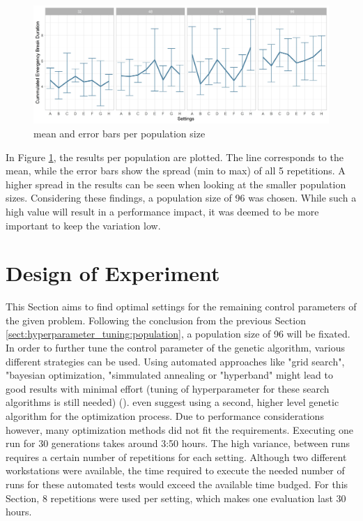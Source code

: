 \begin{figure}[ht] 
	\includegraphics[width=1\linewidth]{simulations/population/plots/comparison}
	\caption{mean and error bars per population size}
	\label{fig:hyperparameter_tuning:population_results}
\end{figure}

In Figure \ref{fig:hyperparameter_tuning:population_results}, the results per population are plotted. The line corresponds to the mean, while the error bars show the spread (min to max) of all 5 repetitions. A higher spread in the results can be seen when looking at the smaller population sizes. Considering these findings, a population size of 96 was chosen. While such a high value will result in a performance impact, it was deemed to be more important to keep the variation low.

\section{Design of Experiment}
\label{sect:hyperparameter_tuning:design_of_experiment}
This Section aims to find optimal settings for the remaining control parameters of the given problem. Following the conclusion from the previous Section \ref{sect:hyperparameter_tuning:population}, a population size of 96 will be fixated. In order to further tune the control parameter of the genetic algorithm, various different strategies can be used. Using automated approaches like "grid search", "bayesian optimization, "simmulated annealing or "hyperband" might lead to good results with minimal effort (tuning of hyperparameter for these search algorithms is still needed) (\cite{kacprzyk_parameter_2007}). \cite{kacprzyk_parameter_2007} even suggest using a second, higher level genetic algorithm for the optimization process. Due to performance considerations however, many optimization methods did not fit the requirements.
Executing one run for 30 generations takes around 3:50 hours. The high variance, between runs requires a certain number of repetitions for each setting. Although two different workstations were available, the time required to execute the needed number of runs for these automated tests would exceed the available time budged. For this Section, 8 repetitions were used per setting, which makes one evaluation last 30 hours.

